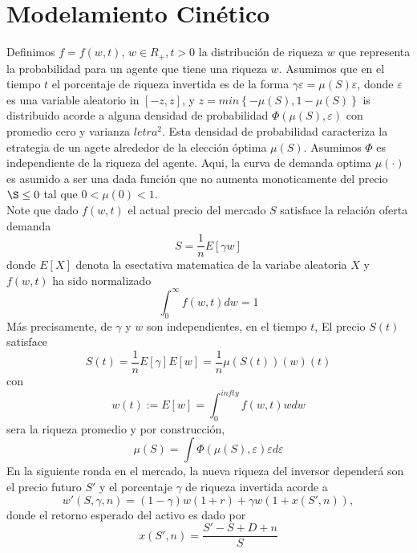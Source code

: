 \documentclass[12pt,a4paper]{article}
\begin{document}
\section*{Modelamiento Cinético}
\quad Definimos $f = f(w,t)$, $w\in R_{+},t >0$ la distribución de riqueza $w$ que representa la probabilidad para un agente que tiene una riqueza $w$. Asumimos que en el tiempo $t$ el porcentaje de riqueza invertida es de la forma $\gamma{\varepsilon}=\mu(S) \varepsilon$, donde $\varepsilon$ es una variable aleatorio in $[-z,z]$, y $z=min\left\{-\mu(S),1-\mu(S)\right\}$ is distribuido acorde a alguna densidad de probabilidad $\Phi(\mu(S),\varepsilon)$ con promedio cero y varianza $letra^{2}$. Esta densidad de probabilidad caracteriza la etrategia de un agete alrededor de la elección óptima $\mu(S)$. Asumimos $\Phi$ es independiente de la riqueza del agente. Aqui, la curva de demanda optima $\mu(\cdot)$ es asumido a ser una dada función que no aumenta monoticamente del precio $\S\leq 0$ tal que $0< \mu(0)<1$.\\
\quad Note que dado $f(w,t)$ el actual precio del mercado $S$ satisface la relación oferta demanda
\begin{equation}
S=\frac{1}{n}E[\gamma w]
\end{equation} 
donde $E[X]$ denota la esectativa matematica de la variabe aleatoria $X$ y $f(w,t)$ ha sido normalizado
\begin{equation}
\int^{\infty}_{0}f(w,t)dw = 1
\end{equation}
Más precisamente, de $\gamma$ y $w$ son independientes, en el tiempo $t$, El precio $S(t)$ satisface 
\begin{equation}
S(t)=\frac{1}{n}E[\gamma] E[w]=\frac{1}{n}\mu(S(t))(w)(t)\label{ec12}
\end{equation} 
con \begin{equation}
w(t){:=} E[w] = \int^{infty}_{0}f(w,t)wdw
\end{equation}
sera la riqueza promedio y por construcción,
\begin{equation}
\mu(S)=\int\Phi(\mu(S),\varepsilon)\varepsilon d\varepsilon
\end{equation}
\quad En la siguiente ronda en el mercado, la nueva riqueza del inversor dependerá son el precio futuro $S'$ y el porcentaje $\gamma$ de riqueza invertida acorde a
\begin{equation}
w'(S,\gamma,n)=(1-\gamma)w(1+r)+\gamma w(1+x(S',n)),
\end{equation}
donde el retorno esperado del activo es dado por
\begin{equation}
x(S',n)=\frac{S'-S+D+n}{S}\label{ec15}
\end{equation}
\end{document}
